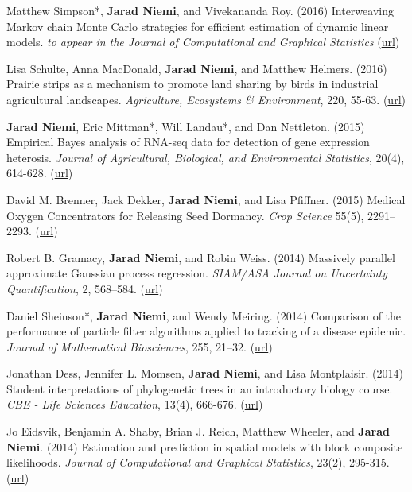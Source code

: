 \documentclass[overlapped,line]{res}
\newcommand{\lastpromo}{}
\begin{document}
\begin{resume}
\lastpromo

Matthew Simpson*, {\bf Jarad Niemi}, and Vivekananda Roy. (2016) Interweaving Markov chain Monte Carlo strategies for efficient estimation of dynamic linear models. \emph{to appear in the Journal of Computational and Graphical Statistics} (\href{http://www.tandfonline.com/doi/abs/10.1080/10618600.2015.1105748}{url})

Lisa Schulte, Anna MacDonald, {\bf Jarad Niemi}, and Matthew Helmers. (2016) Prairie strips as a mechanism to promote land sharing by birds in industrial agricultural landscapes. \emph{Agriculture, Ecosystems \& Environment}, 220, 55-63. (\href{http://www.sciencedirect.com/science/article/pii/S016788091630007X}{url})

{\bf Jarad Niemi}, Eric Mittman*, Will Landau*, and Dan Nettleton. (2015) Empirical Bayes analysis of RNA-seq data for detection of gene expression heterosis. \emph{Journal of Agricultural, Biological, and Environmental Statistics}, 20(4), 614-628. (\href{http://link.springer.com/article/10.1007%2Fs13253-015-0230-5}{url})



David M. Brenner, Jack Dekker, {\bf Jarad Niemi}, and Lisa Pfiffner. (2015) Medical Oxygen Concentrators for Releasing Seed Dormancy. \emph{Crop Science} 55(5), 2291--2293. (\href{https://dl.sciencesocieties.org/publications/cs/pdfs/0/0/cropsci2014.11.0783}{url})

Robert B. Gramacy, {\bf Jarad Niemi}, and Robin Weiss. (2014) Massively parallel approximate Gaussian process regression. \emph{SIAM/ASA Journal on Uncertainty Quantification}, 2, 568--584. (\href{http://epubs.siam.org/doi/abs/10.1137/130941912}{url})

Daniel Sheinson*, {\bf Jarad Niemi}, and Wendy Meiring. (2014) Comparison of the performance of particle filter algorithms applied to tracking of a disease epidemic. \emph{Journal of Mathematical Biosciences}, 255, 21--32. (\href{http://www.sciencedirect.com/science/article/pii/S0025556414001242}{url})

Jonathan Dess, Jennifer L. Momsen, {\bf Jarad Niemi}, and Lisa Montplaisir. (2014) Student interpretations of phylogenetic trees in an introductory biology course. \emph{CBE - Life Sciences Education}, 13(4), 666-676. (\href{http://www.lifescied.org/content/13/4/666.full?sid=7d54efe2-73cc-4823-b359-0ec4066c4e5b}{url})

Jo Eidsvik, Benjamin A. Shaby, Brian J. Reich, Matthew Wheeler, and {\bf Jarad Niemi}. (2014) Estimation and prediction in spatial models with block composite likelihoods. \emph{Journal of Computational and Graphical Statistics}, 23(2), 295-315. (\href{http://amstat.tandfonline.com/doi/abs/10.1080/10618600.2012.760460}{url})



\end{resume}
\end{document}

